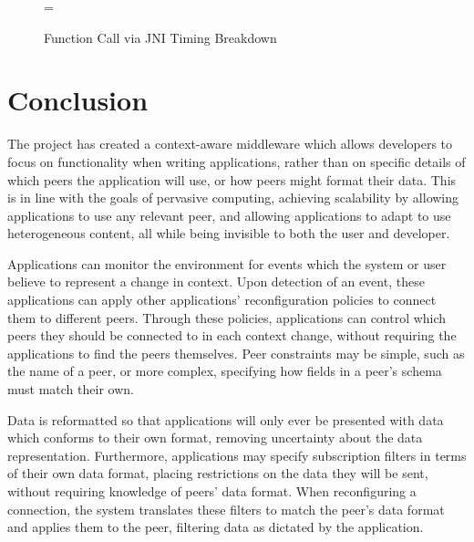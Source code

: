 \documentclass[12pt,twoside,notitlepage]{report}
\begin{document}
\begin{figure}
\epsfxsize=\hsize
\centerline{}
\caption{Function Call via JNI Timing Breakdown}
\label{fig:jni_times}
\end{figure}





\cleardoublepage

\chapter{Conclusion}

The project has created a context-aware middleware which allows developers to focus on functionality when writing applications, rather than on specific details of which peers the application will use, or how peers might format their data. 
This is in line with the goals of pervasive computing, achieving scalability by allowing applications to use any relevant peer, and allowing applications to adapt to use heterogeneous content, all while being invisible to both the user and developer.

Applications can monitor the environment for events which the system or user believe to represent a change in context.
Upon detection of an event, these applications can apply other applications' reconfiguration policies to connect them to different peers. 
Through these policies, applications can control which peers they should be connected to in each context change, without requiring the applications to find the peers themselves.
Peer constraints may be simple, such as the name of a peer, or more complex, specifying how fields in a peer's schema must match their own. 

Data is reformatted so that applications will only ever be presented with data which conforms to their own format, removing uncertainty about the data representation. 
Furthermore, applications may specify subscription filters in terms of their own data format, placing restrictions on the data they will be sent, without requiring knowledge of peers' data format.
When reconfiguring a connection, the system translates these filters to match the peer's data format and applies them to the peer, filtering data as dictated by the application.
\end{document}

